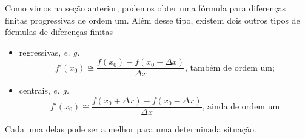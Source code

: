         Como vimos na seção anterior, podemos obter uma fórmula para diferenças finitas progressivas de ordem um. Além desse tipo, existem dois outros tipos de fórmulas de diferenças finitas \cite{ChenMDF}
        \begin{itemize}
            \item regressivas, \textit{e. g.}
            \begin{equation}
                \label{regrlFD}
                f'(x_0) \cong \dfrac{f(x_0) - f(x_0 - \Delta x)}{\Delta x}\text{, também de ordem um;}
            \end{equation}
            \item centrais, \textit{e. g.}
            \begin{equation}
                \label{centralFD}
                f'(x_0) \cong \dfrac{f(x_0 + \Delta x) - f(x_0 - \Delta x)}{\Delta x}\text{, ainda de ordem um}
            \end{equation}
        \end{itemize}
        Cada uma delas pode ser a melhor para uma determinada situação.
        
        
